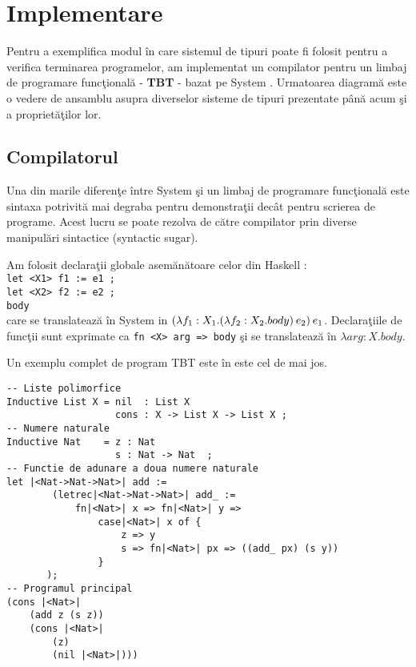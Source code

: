 
\chapter{Implementare}
\label{Capitolul6}

Pentru a exemplifica modul \^ in care sistemul de tipuri poate fi folosit pentru a verifica terminarea programelor, am implementat un compilator pentru un limbaj de programare func\c tional\u a - \textbf{TBT} - bazat pe System \fhat. Urmatoarea diagram\u a este o vedere de ansamblu asupra diverselor sisteme de tipuri prezentate p\^ an\u a acum \c si a propriet\u a\c tilor lor.

\done{}
\begin{center}

\end{center}

\section{Compilatorul}
Una din marile diferen\c te \^ intre System \fhat \c si un limbaj de programare func\c tional\u a este sintaxa potrivit\u a mai degraba pentru demonstra\c tii dec\^ at pentru scrierea de programe. Acest lucru se poate rezolva de c\u atre compilator prin diverse manipul\u ari sintactice (syntactic sugar).

\begin{example}
Am folosit declara\c tii globale asem\u an\u atoare celor din Haskell :\\
\texttt{\scriptsize let <X1> f1 := e1 ;} \\
\texttt{\scriptsize let <X2> f2 := e2 ;} \\
\texttt{\scriptsize body}\\
care se translateaz\u a \^ in System \fhat in $(\lambda f_1 : X_1. (\lambda f_2 : X_2. body)\hspace{2pt} e_2) \hspace{2pt} e_1$. Declara\c tiile de func\c tii sunt exprimate ca \texttt{\scriptsize fn <X> arg => body} \c si se translateaz\u a \^ in $\lambda arg : X.body$.
\end{example}

Un exemplu complet de program TBT este \^ in este cel de mai jos.
\begin{lstlisting}[label=impl_example,captionpos=b,caption=Exemplu de program complet]
-- Liste polimorfice
Inductive List X = nil  : List X
                   cons : X -> List X -> List X ;
-- Numere naturale
Inductive Nat    = z : Nat
                   s : Nat -> Nat  ;
-- Functie de adunare a doua numere naturale
let |<Nat->Nat->Nat>| add :=
        (letrec|<Nat->Nat->Nat>| add_ :=
            fn|<Nat>| x => fn|<Nat>| y =>
                case|<Nat>| x of {
                    z => y
                    s => fn|<Nat>| px => ((add_ px) (s y))
                }
       );
-- Programul principal
(cons |<Nat>|
    (add z (s z))
    (cons |<Nat>|
        (z)
        (nil |<Nat>|)))
\end{lstlisting}

